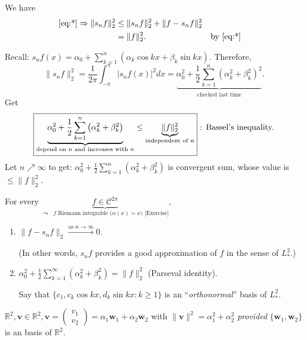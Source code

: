 \documentclass[letterpaper, reqno,11pt]{article}
\newcommand{\RR}{\mathbb{R}}
\begin{document}
We have
\begin{align*}
  \eqref{eq:*} \Rightarrow \lVert s_n f \rVert_2^2 &\leq \lVert s_n f \rVert_2^2 + \lVert f - s_n f \rVert_2^2 \\
  &= \lVert f \rVert_2^2. && \text{by \eqref{eq:*}}
\end{align*}

Recall: $s_n f(x) = \alpha_0 + \sum_{k = 1}^n (\alpha_k \cos kx + \beta_k \sin kx)$. Therefore,
\[ \lVert s_n f \rVert_2^2 = \frac{1}{2\pi} \int_{-\pi}^\pi |s_n f(x)|^2 dx = \underbrace{\alpha_0^2 + \frac{1}{2} \sum_{k = 1}^n \left(\alpha_k^2 + \beta_k^2\right)^2}_\text{checked last time}. \]
Get
\[ \fbox{\text{$\underbrace{\alpha_0^2 + \frac{1}{2} \sum_{k = 1}^n \left(\alpha_k^2 + \beta_k^2\right)}_\text{depend on $n$ and increases with $n$} \leq \underbrace{\lVert f \rVert_2^2}_\text{independent of $n$}$}} \text{ : Bassel's inequality.} \]
Let $n \nearrow \infty$ to get: $\alpha_0^2 + \frac{1}{2} \sum_{k = 1}^n \left(\alpha_k^2 + \beta_k^2\right)$ is convergent sum, whose value is $\leq \lVert f \rVert_2^2$.

\begin{thm}[Plancherel]
  \normalfont For every $\underbrace{f \in \mathcal C^{2\pi}}_\text{$\leadsto$ $f$ Riemann integrable ($\alpha(x) = x$) [Exercise]}$,
  \begin{enumerate}
  \item $\lVert f - s_n f \rVert_2 \xrightarrow{\text{as $n \to \infty$}} 0$.

    (In other words, $s_n f$ provides a good approximation of $f$ in the sense of $L_*^2$.)
  \item $\alpha_0^2 + \frac{1}{2} \sum_{k = 1}^\infty \left(\alpha_k^2 + \beta_k^2\right) = \lVert f \rVert_2^2$ (Parseval identity).

    Say that $\{ c_1 , c_k \cos kx, d_k \sin kx : k \geq 1 \}$ is an ``\emph{orthonormal}'' basis of $L_*^2$.
  \end{enumerate}
\end{thm}


\medskip

$\RR^2, \mathbf v \in \RR^2, \mathbf v = \begin{pmatrix} v_1 \\ v_2 \end{pmatrix} = \alpha_1 \mathbf w_1 + \alpha_2 \mathbf w_2$ with $\lVert \mathbf v \rVert^2 = \alpha_1^2 + \alpha_2^2$ \emph{provided} $\{ \mathbf w_1, \mathbf w_2 \}$ is an  basis of $\RR^2$.
\end{document}
